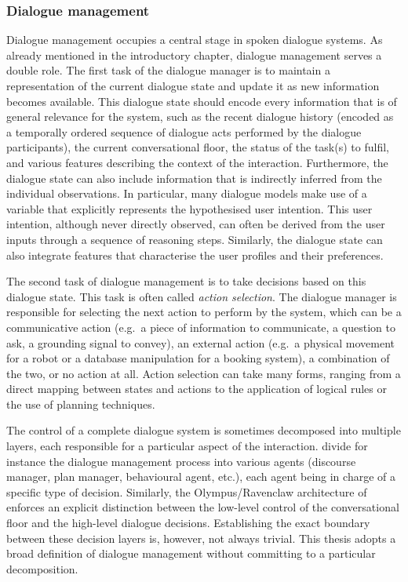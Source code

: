 \subsubsection*{Dialogue management}

Dialogue management occupies a central stage in spoken dialogue systems.  As already mentioned in the introductory chapter, dialogue management serves a double role.  The first task of the dialogue manager is to maintain a representation of the current dialogue state and update it as new information becomes available. This dialogue state should encode every information that is of general relevance for the system, such as the recent dialogue history (encoded as a temporally ordered sequence of dialogue acts performed by the dialogue participants), the current conversational floor, the status of the task(s) to fulfil, and various features describing the context of the interaction.  Furthermore, the dialogue state can also include information that is indirectly inferred from the individual observations. In particular, many dialogue models make use of a variable that explicitly represents the hypothesised user intention.  This user intention, although never directly observed, can often be derived from the user inputs through a sequence of reasoning steps.  Similarly, the dialogue state can also integrate features that characterise the user profiles and their preferences. %

The second task of dialogue management is to take decisions based on this dialogue state.  This task is often called \textit{action selection}.  The dialogue manager is responsible for selecting the next action to perform by the system, which can be a communicative action (e.g.\ a piece of information to communicate, a question to ask, a grounding signal to convey), an external action (e.g.\ a physical movement for a robot or a database manipulation for a booking system), a combination of the two, or no action at all.  Action selection can take many forms, ranging from a direct mapping between states and actions to the application of logical rules or the use of planning techniques. 

The control of a complete dialogue system is sometimes decomposed into multiple  layers, each responsible for a particular aspect of the interaction. \cite{Allen:2000:AGD:973935.973937} divide for instance the dialogue management process into various agents (discourse manager, plan manager, behavioural agent, etc.), each agent being in charge of a specific type of decision. Similarly, the Olympus/Ravenclaw architecture of \cite{Bohus:2009} enforces an explicit distinction between the low-level control of the conversational floor and the high-level dialogue decisions.  Establishing the exact boundary between these decision layers is, however, not always trivial. This thesis adopts a broad definition of dialogue management without committing to a particular decomposition. 

